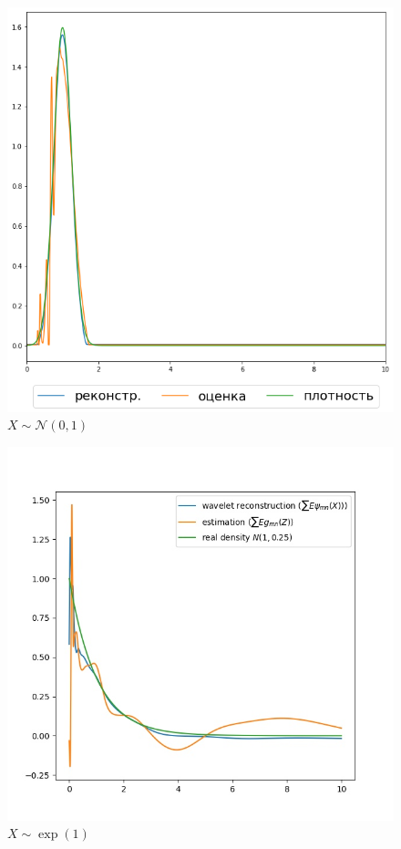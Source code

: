 \documentclass[12pt, a4paper]{report}
\begin{document}
\begin{figure}[h]
    \caption{$X \sim \mathcal{N}(0, 1)$}
    \centering
    \includegraphics[width=\textwidth]{norm}
\end{figure}

\begin{figure}[h]
    \caption{$X \sim \exp(1)$}
    \centering
    \includegraphics[width=\textwidth]{exp}
\end{figure}
\end{document}
